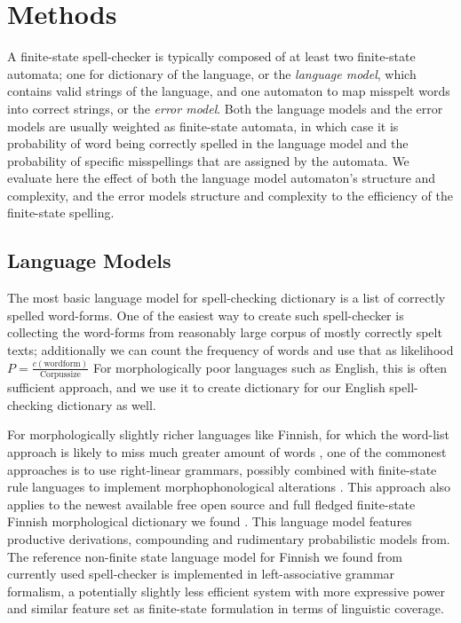 \documentclass[11pt]{article}
\begin{document}
\section{Methods}
\label{sec:methods}

A finite-state spell-checker is typically composed of at least two finite-state
automata; one for dictionary of the language, or the \emph{language model},
which contains valid strings of the language, and one automaton to map misspelt
words into correct strings, or the \emph{error model}. Both the language models
and the error models are usually weighted as finite-state automata, in which
case it is probability of word being correctly spelled in the language model
and the probability of specific misspellings that are assigned by the automata.
We evaluate here the effect of both the language model automaton's structure
and complexity, and the error models structure and complexity to the efficiency
of the finite-state spelling. 

\subsection{Language Models}
\label{subsec:language-models}

The most basic language model for spell-checking dictionary is a list of
correctly spelled word-forms. One of the easiest way to create such 
spell-checker is collecting the word-forms from reasonably large corpus of
mostly correctly spelt texts; additionally we can count the frequency of words
and use that as likelihood $P=\frac{c(\mathrm{wordform})}{\mathrm{Corpus size}}$
For morphologically poor languages such as English, this is often sufficient
approach\cite{norvig/2010}, and we use it to create dictionary for our English
spell-checking dictionary as well.

For morphologically slightly richer languages like Finnish, for which the
word-list approach is likely to miss much greater amount of words \cite{}, one
of the commonest approaches is to use right-linear grammars, possibly combined
with finite-state rule languages to implement morphophonological alterations
\cite{koskenniemi/1983,beesley/2003}. This approach also applies to the newest
available free open source and full fledged finite-state Finnish morphological
dictionary we found \cite{pirinen/2011/nodalida}. This language model features
productive derivations, compounding and rudimentary probabilistic models from.
The reference non-finite state language model for Finnish we found from
currently used spell-checker is implemented in left-associative grammar
formalism, a potentially slightly less efficient system with more expressive
power and similar feature set as finite-state formulation in terms of
linguistic coverage.
\end{document}
